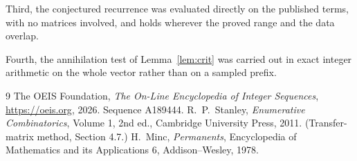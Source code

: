 \documentclass[11pt,a4paper]{article}
\theoremstyle{plain}
\theoremstyle{definition}
\begin{document}
Third, the conjectured recurrence was evaluated directly on the published terms, with no
matrices involved, and holds wherever the proved range and the data overlap.

Fourth, the annihilation test of Lemma~\ref{lem:crit} was carried out in exact integer
arithmetic on the whole vector rather than on a sampled prefix.

\begin{thebibliography}{9}
 The OEIS Foundation, \emph{The On-Line Encyclopedia of Integer
Sequences}, \url{https://oeis.org}, 2026. Sequence A189444.
 R.~P.~Stanley, \emph{Enumerative Combinatorics}, Volume 1, 2nd ed.,
Cambridge University Press, 2011. (Transfer-matrix method, Section 4.7.)
 H.~Minc, \emph{Permanents}, Encyclopedia of Mathematics and its
Applications 6, Addison--Wesley, 1978.
\end{thebibliography}
\end{document}
